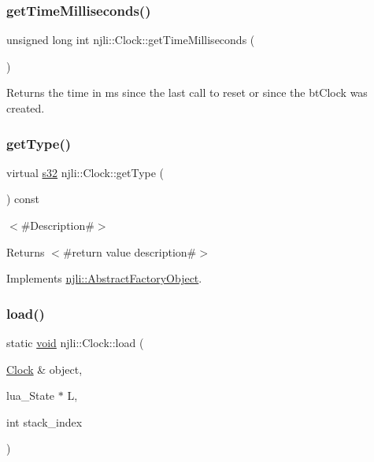 \subsubsection{\texorpdfstring{get\+Time\+Milliseconds()}{getTimeMilliseconds()}}
{\footnotesize\ttfamily unsigned long int njli\+::\+Clock\+::get\+Time\+Milliseconds (\begin{DoxyParamCaption}{ }\end{DoxyParamCaption})}

Returns the time in ms since the last call to reset or since the bt\+Clock was created. \mbox{\label{classnjli_1_1_clock_a403ec7bf5455930215121622d0324fb4}} 
\subsubsection{\texorpdfstring{get\+Type()}{getType()}}
{\footnotesize\ttfamily virtual \mbox{\hyperlink{_util_8h_aa62c75d314a0d1f37f79c4b73b2292e2}{s32}} njli\+::\+Clock\+::get\+Type (\begin{DoxyParamCaption}{ }\end{DoxyParamCaption}) const\hspace{0.3cm}{\ttfamily [virtual]}}

$<$\#\+Description\#$>$

\begin{DoxyReturn}{Returns}
$<$\#return value description\#$>$ 
\end{DoxyReturn}


Implements \mbox{\hyperlink{classnjli_1_1_abstract_factory_object_a207c86146d40d0794708ae7f2d4e60a7}{njli\+::\+Abstract\+Factory\+Object}}.

\mbox{\label{classnjli_1_1_clock_a8581e8a61763f24e24929a4806387cdb}} 
\subsubsection{\texorpdfstring{load()}{load()}}
{\footnotesize\ttfamily static \mbox{\hyperlink{_thread_8h_af1e856da2e658414cb2456cb6f7ebc66}{void}} njli\+::\+Clock\+::load (\begin{DoxyParamCaption}\item[{\mbox{\hyperlink{classnjli_1_1_clock}{Clock}} \&}]{object,  }\item[{lua\+\_\+\+State $\ast$}]{L,  }\item[{int}]{stack\+\_\+index }\end{DoxyParamCaption})\hspace{0.3cm}{\ttfamily [static]}}

